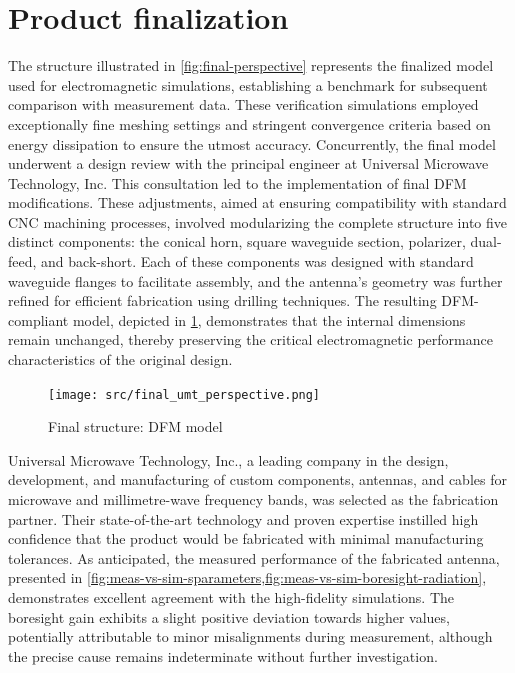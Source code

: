 \documentclass[11pt,a4paper,twoside,openany]{report}
\begin{document}
\section{Product finalization}
The structure illustrated in \cref{fig:final-perspective} represents the finalized model used for electromagnetic simulations, establishing a benchmark for subsequent comparison with measurement data. These verification simulations employed exceptionally fine meshing settings and stringent convergence criteria based on energy dissipation to ensure the utmost accuracy. Concurrently, the final model underwent a design review with the principal engineer at Universal Microwave Technology, Inc. This consultation led to the implementation of final DFM modifications. These adjustments, aimed at ensuring compatibility with standard CNC machining processes, involved modularizing the complete structure into five distinct components: the conical horn, square waveguide section, polarizer, dual-feed, and back-short. Each of these components was designed with standard waveguide flanges to facilitate assembly, and the antenna's geometry was further refined for efficient fabrication using drilling techniques. The resulting DFM-compliant model, depicted in \cref{fig:final-umt-perspective}, demonstrates that the internal dimensions remain unchanged, thereby preserving the critical electromagnetic performance characteristics of the original design.

\begin{figure}[!ht]
    \centering
    \texttt{[image: src/final\_umt\_perspective.png]}
    \caption{\label{fig:final-umt-perspective}Final structure: DFM model}
\end{figure}

Universal Microwave Technology, Inc., a leading company in the design, development, and manufacturing of custom components, antennas, and cables for microwave and millimetre-wave frequency bands, was selected as the fabrication partner. Their state-of-the-art technology and proven expertise instilled high confidence that the product would be fabricated with minimal manufacturing tolerances. As anticipated, the measured performance of the fabricated antenna, presented in \cref{fig:meas-vs-sim-sparameters,fig:meas-vs-sim-boresight-radiation}, demonstrates excellent agreement with the high-fidelity simulations. The boresight gain exhibits a slight positive deviation towards higher values, potentially attributable to minor misalignments during measurement, although the precise cause remains indeterminate without further investigation.
\end{document}
